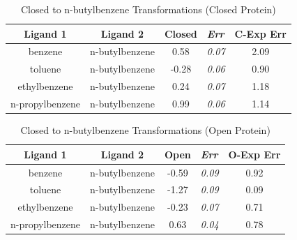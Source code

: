 \documentclass[journal=jctcce,manuscript=article]{achemso}
\begin{document}
\begin{table}[!htb]
\centering
\caption{Closed to n-butylbenzene Transformations (Closed Protein)}
\label{tbl:C-nbutyl_closed}
\begin{tabular}{|c|c|c|l|c|}
\hline
\textbf{Ligand 1}                       & \textbf{Ligand 2}                      & {\color[HTML]{800080} \textbf{Closed}} & {\color[HTML]{800080} \textit{Err}} & \textbf{C-Exp Err}           \\ \hline
\cellcolor[HTML]{800080}benzene         & \cellcolor[HTML]{00FFFF}n-butylbenzene & 0.58                                   & \textit{0.07}                       & \cellcolor[HTML]{FFCCC9}2.09 \\ \hline
\cellcolor[HTML]{800080}toluene         & \cellcolor[HTML]{00FFFF}n-butylbenzene & -0.28                                  & \textit{0.06}                       & \cellcolor[HTML]{9AFF99}0.90 \\ \hline
\cellcolor[HTML]{800080}ethylbenzene    & \cellcolor[HTML]{00FFFF}n-butylbenzene & 0.24                                   & \textit{0.07}                       & \cellcolor[HTML]{FFCCC9}1.18 \\ \hline
\cellcolor[HTML]{800080}n-propylbenzene & \cellcolor[HTML]{00FFFF}n-butylbenzene & 0.99                                   & \textit{0.06}                       & \cellcolor[HTML]{FFCCC9}1.14 \\ \hline
\end{tabular}
\end{table}

\begin{table}[!htb]
\centering
\caption{Closed to n-butylbenzene Transformations (Open Protein)}
\label{tbl:C-nbutyl_open}
\begin{tabular}{|c|c|c|l|c|}
\hline
\textbf{Ligand 1}                       & \textbf{Ligand 2}                      & {\color[HTML]{008000} \textbf{Open}} & {\color[HTML]{008000} \textit{Err}} & \textbf{O-Exp Err}           \\ \hline
\cellcolor[HTML]{800080}benzene         & \cellcolor[HTML]{00FFFF}n-butylbenzene & -0.59                                & \textit{0.09}                       & \cellcolor[HTML]{9AFF99}0.92 \\ \hline
\cellcolor[HTML]{800080}toluene         & \cellcolor[HTML]{00FFFF}n-butylbenzene & -1.27                                & \textit{0.09}                       & \cellcolor[HTML]{9AFF99}0.09 \\ \hline
\cellcolor[HTML]{800080}ethylbenzene    & \cellcolor[HTML]{00FFFF}n-butylbenzene & -0.23                                & \textit{0.07}                       & \cellcolor[HTML]{9AFF99}0.71 \\ \hline
\cellcolor[HTML]{800080}n-propylbenzene & \cellcolor[HTML]{00FFFF}n-butylbenzene & 0.63                                 & \textit{0.04}                       & \cellcolor[HTML]{9AFF99}0.78 \\ \hline
\end{tabular}
\end{table}

\clearpage


\end{document}
